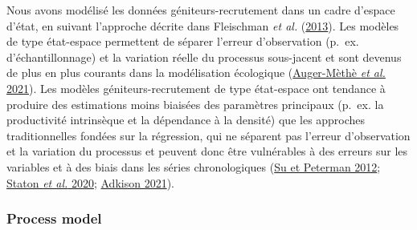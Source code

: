 \documentclass[french,11pt]{book}
\begin{document}
Nous avons modélisé les données géniteurs-recrutement dans un cadre d'espace d'état, en suivant l'approche décrite dans Fleischman \emph{et al.} (\protect\hyperlink{ref-fleischmanAgestructuredStatespaceStock2013}{2013}). Les modèles de type état-espace permettent de séparer l'erreur d'observation (p.~ex. d'échantillonnage) et la variation réelle du processus sous-jacent et sont devenus de plus en plus courants dans la modélisation écologique (\protect\hyperlink{ref-auger-metheGuideStateSpace2021}{Auger-Mèthè \emph{et al.} 2021}). Les modèles géniteurs-recrutement de type état-espace ont tendance à produire des estimations moins biaisées des paramètres principaux (p.~ex. la productivité intrinsèque et la dépendance à la densité) que les approches traditionnelles fondées sur la régression, qui ne séparent pas l'erreur d'observation et la variation du processus et peuvent donc être vulnérables à des erreurs sur les variables et à des biais dans les séries chronologiques (\protect\hyperlink{ref-suPerformanceBayesianStatespace2012}{Su et Peterman 2012}; \protect\hyperlink{ref-statonEvaluationMethodsSpawner2020}{Staton \emph{et al.} 2020}; \protect\hyperlink{ref-adkisonReviewSalmonSpawnerRecruitment2021}{Adkison 2021}).

\hypertarget{process-model}{%
\subsubsection{Process model}\label{process-model}}
\end{document}

